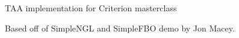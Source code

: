 T\+AA implementation for Criterion masterclass

Based off of Simple\+N\+GL and Simple\+F\+BO demo by Jon Macey. 